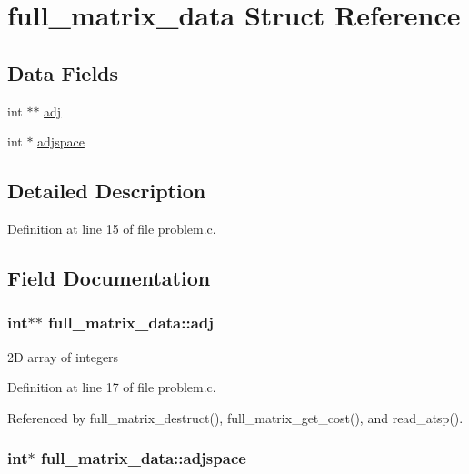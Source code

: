\hypertarget{structfull__matrix__data}{
\section{full\_\-matrix\_\-data Struct Reference}
\label{structfull__matrix__data}
}
\subsection*{Data Fields}
\begin{CompactItemize}
\item 
int $\ast$$\ast$ \hyperlink{structfull__matrix__data_52eb922d8bc3eaacda3456933e130440}{adj}
\item 
int $\ast$ \hyperlink{structfull__matrix__data_ea7894cbcda81788ba158712027fb8c5}{adjspace}
\end{CompactItemize}


\subsection{Detailed Description}


Definition at line 15 of file problem.c.

\subsection{Field Documentation}
\hypertarget{structfull__matrix__data_52eb922d8bc3eaacda3456933e130440}{
\subsubsection[{adj}]{\setlength{\rightskip}{0pt plus 5cm}int$\ast$$\ast$ {\bf full\_\-matrix\_\-data::adj}}}
\label{structfull__matrix__data_52eb922d8bc3eaacda3456933e130440}


2D array of integers 

Definition at line 17 of file problem.c.

Referenced by full\_\-matrix\_\-destruct(), full\_\-matrix\_\-get\_\-cost(), and read\_\-atsp().\hypertarget{structfull__matrix__data_ea7894cbcda81788ba158712027fb8c5}{
\subsubsection[{adjspace}]{\setlength{\rightskip}{0pt plus 5cm}int$\ast$ {\bf full\_\-matrix\_\-data::adjspace}}}
\label{structfull__matrix__data_ea7894cbcda81788ba158712027fb8c5}


